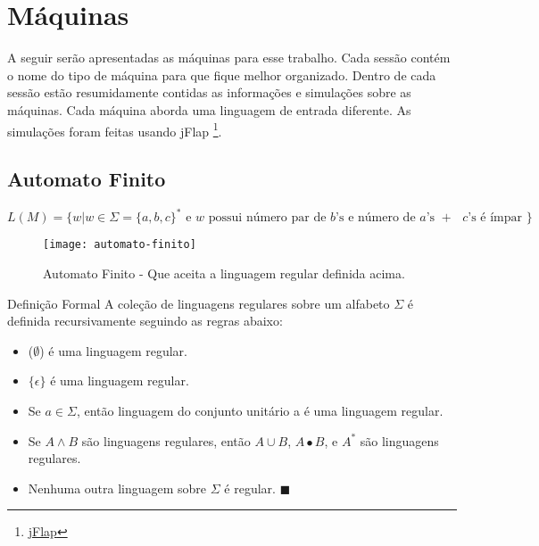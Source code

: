 \documentclass[12pt, a4paper]{article}
\begin{document}



\tableofcontents
\clearpage
\listoffigures
\clearpage



\section{Máquinas}

\qquad A seguir ser\~{a}o apresentadas as m\'{a}quinas para esse trabalho. Cada sess\~{a}o cont\'{e}m o nome do tipo de m\'{a}quina para que fique melhor organizado. Dentro de cada sess\~{a}o estão resumidamente contidas as informaç\~{o}es e simulaç\~{o}es sobre as m\'{a}quinas. Cada m\'{a}quina aborda uma linguagem de entrada diferente. As simulaç\~{o}es foram feitas usando jFlap \footnote{\href{http://www.cs.duke.edu/csed/jflap/}{jFlap}}.

\pagebreak
\subsection{Automato Finito}

$$ L(M)= \lbrace w \vert w \in \Sigma =  {\lbrace a,b,c \rbrace}^* \text{ e $w$ possui número par de $b$'s e número de $a$'s $+$ $c$'s é ímpar } \rbrace$$

\begin{figure}[ht]
\centering
\texttt{[image: automato-finito]}
\caption{Automato Finito - Que aceita a linguagem regular definida acima.}
\end{figure}

\qquad Definição Formal
A coleção de linguagens regulares sobre um alfabeto $\Sigma$ é definida recursivamente seguindo as regras abaixo:

\begin{itemize}
\item ($\emptyset$) é uma linguagem regular.
\item $\lbrace \epsilon \rbrace$ é uma linguagem regular.
\item Se $ a \in \Sigma$, então linguagem do conjunto unitário a é uma linguagem regular.
\item Se $A \wedge B$ são linguagens regulares, então $A \cup B$, $A \bullet B$, e ${A}^*$ são linguagens regulares.
\item Nenhuma outra linguagem sobre $\Sigma$ é regular. $\blacksquare$
\end{itemize}
\end{document}
